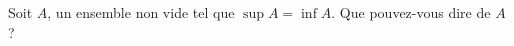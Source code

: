 

\begin{exercice}\label{exoSerieUn0010}

	Soit $A$, un ensemble non vide tel que $\sup A=\inf A$. Que pouvez-vous dire de $A$ ?

\end{exercice}
